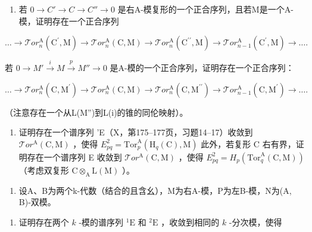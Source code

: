 \begin{enumerate}
\def\labelenumi{\alph{enumi})}
\setcounter{enumi}{1}
\tightlist
\item
  若 \(0 \to C' \to C \to C'' \to 0\) 是右A-模复形的一个正合序列，且若M是一个A-模，证明存在一个正合序列
\end{enumerate}

\[
\dots \rightarrow \mathcal {T} o r _ {n} ^ {\mathrm{A}} (\mathrm{C} ^ {\prime}, \mathrm{M}) \rightarrow \mathcal {T} o r _ {n} ^ {\mathrm{A}} (\mathrm{C}, \mathrm{M}) \rightarrow \mathcal {T} o r _ {n} ^ {\mathrm{A}} (\mathrm{C} ^ {\prime \prime}, \mathrm{M}) \rightarrow \mathcal {T} o r _ {n - 1} ^ {\mathrm{A}} (\mathrm{C} ^ {\prime}, \mathrm{M}) \rightarrow \dots .
\]

若 \(0 \to M' \xrightarrow{i} M \xrightarrow{p} M'' \to 0\) 是A-模的一个正合序列，证明存在一个正合序列：

\[
\dots \rightarrow \mathcal {T} o r _ {n} ^ {\mathrm{A}} (\mathrm{C}, \mathrm{M} ^ {\prime}) \rightarrow \mathcal {T} o r _ {n} ^ {\mathrm{A}} (\mathrm{C}, \mathrm{M}) \rightarrow \mathcal {T} o r _ {n} ^ {\mathrm{A}} (\mathrm{C}, \mathrm{M} ^ {\prime \prime}) \rightarrow \mathcal {T} o r _ {n - 1} ^ {\mathrm{A}} (\mathrm{C}, \mathrm{M} ^ {\prime}) \rightarrow \dots .
\]

（注意存在一个从L(M'')到L(i)的锥的同伦映射）。

\begin{enumerate}
\def\labelenumi{\alph{enumi})}
\setcounter{enumi}{2}
\tightlist
\item
  证明存在一个谱序列 'E（X，第175–177页，习题14–17）收敛到 \(\mathcal{T}or^{\mathrm{A}}(\mathrm{C},\mathrm{M})\) ，使得 \(E_{pq}^{2} = \mathrm{Tor}_{p}^{\mathrm{A}}(\mathrm{H}_{q}(\mathrm{C}),\mathrm{M})\) 此外，若复形 C 右有界，证明存在一个谱序列 E 收敛到 \(\mathcal{T}or^{\mathrm{A}}(\mathrm{C},\mathrm{M})\) ，使得 \(E_{pq}^{2} = H_{p}(\mathrm{Tor}_{q}^{\mathrm{A}}(\mathrm{C},\mathrm{M}))\) （考虑双复形 \(\mathrm{C}\otimes_{\mathrm{A}}\mathrm{L}(\mathrm{M})\) ）。
\end{enumerate}

\begin{enumerate}
\def\labelenumi{\arabic{enumi})}
\setcounter{enumi}{7}
\tightlist
\item
  设A、B为两个k-代数（结合的且含幺），M为右A-模，P为左B-模，N为(A, B)-双模。
\end{enumerate}

\begin{enumerate}
\def\labelenumi{\alph{enumi})}
\tightlist
\item
  证明存在两个 \(k\) -模的谱序列 \({}^{1}\mathrm{E}\) 和 \({}^{2}\mathrm{E}\) ，收敛到相同的 \(k\) -分次模，使得
\end{enumerate}

